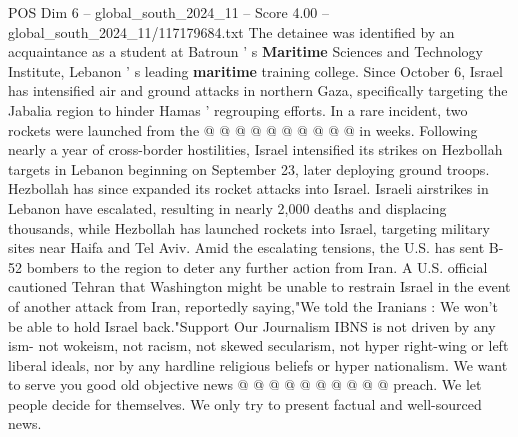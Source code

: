 \begin{textsample}{POS Dim 6 – global\_south\_2024\_11 – Score 4.00 – global\_south\_2024\_11/117179684.txt}
The detainee was identified by an acquaintance as a student at Batroun ' s \textbf{Maritime} Sciences and Technology Institute, Lebanon ' s leading \textbf{maritime} training college.
Since October 6, Israel has intensified air and ground attacks in northern Gaza, specifically targeting the Jabalia region to hinder Hamas ' regrouping efforts.
In a rare incident, two rockets were launched from the @ @ @ @ @ @ @ @ @ @ in weeks.
Following nearly a year of cross-border hostilities, Israel intensified its strikes on Hezbollah targets in Lebanon beginning on September 23, later deploying ground troops.
Hezbollah has since expanded its rocket attacks into Israel.
Israeli airstrikes in Lebanon have escalated, resulting in nearly 2,000 deaths and displacing thousands, while Hezbollah has launched rockets into Israel, targeting military sites near Haifa and Tel Aviv.
Amid the escalating tensions, the U.S. has sent B-52 bombers to the region to deter any further action from Iran.
A U.S. official cautioned Tehran that Washington might be unable to restrain Israel in the event of another attack from Iran, reportedly saying,"We told the Iranians : We won't be able to hold Israel back."Support Our Journalism IBNS is not driven by any ism- not wokeism, not racism, not skewed secularism, not hyper right-wing or left liberal ideals, nor by any hardline religious beliefs or hyper nationalism.
We want to serve you good old objective news @ @ @ @ @ @ @ @ @ @ preach.
We let people decide for themselves.
We only try to present factual and well-sourced news.

\end{textsample}
